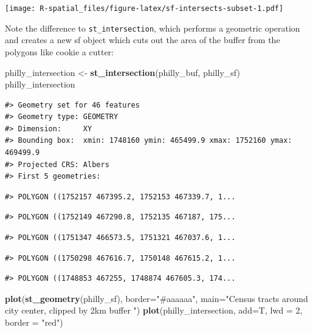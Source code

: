 \documentclass[
]{book}
\newenvironment{Shaded}{\begin{snugshade}}{\end{snugshade}}
\newcommand{\AttributeTok}[1]{\textcolor[rgb]{0.13,0.29,0.53}{#1}}
\newcommand{\DecValTok}[1]{\textcolor[rgb]{0.00,0.00,0.81}{#1}}
\newcommand{\FunctionTok}[1]{\textcolor[rgb]{0.13,0.29,0.53}{\textbf{#1}}}
\newcommand{\NormalTok}[1]{#1}
\newcommand{\OtherTok}[1]{\textcolor[rgb]{0.56,0.35,0.01}{#1}}
\newcommand{\StringTok}[1]{\textcolor[rgb]{0.31,0.60,0.02}{#1}}
\begin{document}
\texttt{[image: R-spatial\_files/figure-latex/sf-intersects-subset-1.pdf]}

Note the difference to \texttt{st\_intersection}, which performs a geometric operation and creates a new sf object which cuts out the area of the buffer from the polygons like cookie a cutter:

\begin{Shaded}
\begin{Highlighting}[]
\NormalTok{philly\_intersection }\OtherTok{\textless{}{-}} \FunctionTok{st\_intersection}\NormalTok{(philly\_buf, philly\_sf)}
\NormalTok{philly\_intersection}
\end{Highlighting}
\end{Shaded}

\begin{verbatim}
#> Geometry set for 46 features 
#> Geometry type: GEOMETRY
#> Dimension:     XY
#> Bounding box:  xmin: 1748160 ymin: 465499.9 xmax: 1752160 ymax: 469499.9
#> Projected CRS: Albers
#> First 5 geometries:
\end{verbatim}

\begin{verbatim}
#> POLYGON ((1752157 467395.2, 1752153 467339.7, 1...
\end{verbatim}

\begin{verbatim}
#> POLYGON ((1752149 467290.8, 1752135 467187, 175...
\end{verbatim}

\begin{verbatim}
#> POLYGON ((1751347 466573.5, 1751321 467037.6, 1...
\end{verbatim}

\begin{verbatim}
#> POLYGON ((1750298 467616.7, 1750148 467615.2, 1...
\end{verbatim}

\begin{verbatim}
#> POLYGON ((1748853 467255, 1748874 467605.3, 174...
\end{verbatim}

\begin{Shaded}
\begin{Highlighting}[]
\FunctionTok{plot}\NormalTok{(}\FunctionTok{st\_geometry}\NormalTok{(philly\_sf), }\AttributeTok{border=}\StringTok{"\#aaaaaa"}\NormalTok{, }\AttributeTok{main=}\StringTok{"Census tracts around city center, clipped by 2km buffer "}\NormalTok{)}
\FunctionTok{plot}\NormalTok{(philly\_intersection, }\AttributeTok{add=}\NormalTok{T, }\AttributeTok{lwd =} \DecValTok{2}\NormalTok{, }\AttributeTok{border =} \StringTok{"red"}\NormalTok{)}
\end{Highlighting}
\end{Shaded}
\end{document}
